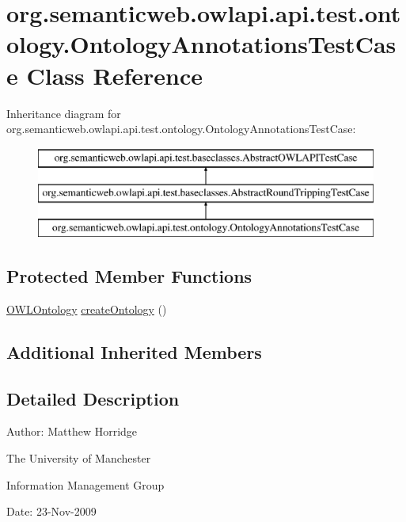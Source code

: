 \hypertarget{classorg_1_1semanticweb_1_1owlapi_1_1api_1_1test_1_1ontology_1_1_ontology_annotations_test_case}{\section{org.\-semanticweb.\-owlapi.\-api.\-test.\-ontology.\-Ontology\-Annotations\-Test\-Case Class Reference}
\label{classorg_1_1semanticweb_1_1owlapi_1_1api_1_1test_1_1ontology_1_1_ontology_annotations_test_case}
}
Inheritance diagram for org.\-semanticweb.\-owlapi.\-api.\-test.\-ontology.\-Ontology\-Annotations\-Test\-Case\-:\begin{figure}[H]
\begin{center}
\leavevmode
\includegraphics[height=3.000000cm]{classorg_1_1semanticweb_1_1owlapi_1_1api_1_1test_1_1ontology_1_1_ontology_annotations_test_case}
\end{center}
\end{figure}
\subsection*{Protected Member Functions}
\begin{DoxyCompactItemize}
\item 
\hyperlink{interfaceorg_1_1semanticweb_1_1owlapi_1_1model_1_1_o_w_l_ontology}{O\-W\-L\-Ontology} \hyperlink{classorg_1_1semanticweb_1_1owlapi_1_1api_1_1test_1_1ontology_1_1_ontology_annotations_test_case_ab2970bd008c6c8bfae9f35aba9e6296f}{create\-Ontology} ()
\end{DoxyCompactItemize}
\subsection*{Additional Inherited Members}


\subsection{Detailed Description}
Author\-: Matthew Horridge\par
 The University of Manchester\par
 Information Management Group\par
 Date\-: 23-\/\-Nov-\/2009 

